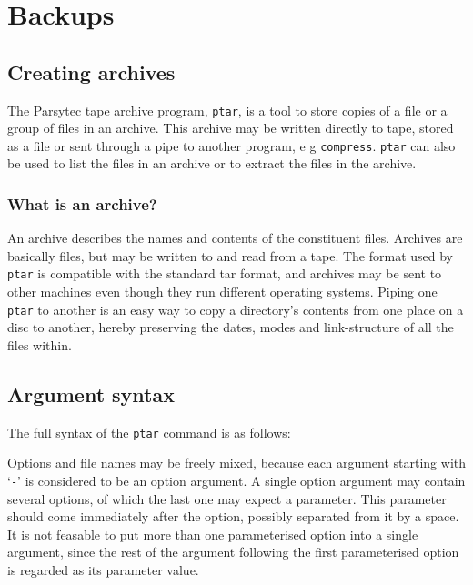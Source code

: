 \chapter{Backups}

\section{Creating archives}

The Parsytec tape archive program, {\tt ptar}, is a tool 
to store copies of a file or a group of files in an archive. This archive may be 
written directly to tape, stored as a file or sent through a pipe to another 
program, e g {\tt compress}. {\tt ptar} can also be used to list the files in an 
archive or to extract the files in the archive.

\subsection{What is an archive?}

An archive describes the names and contents of the constituent files. 
Archives are basically files, but may be written to and read from a tape. The 
format used by {\tt ptar} is compatible with the standard tar format, and 
archives may be sent to other machines even though they run different 
operating systems. Piping one {\tt ptar} to another is an easy way to copy a 
directory's contents from one place on a disc to another, hereby preserving 
the dates, modes and link-structure of all the files within.

\section{Argument syntax}

The full syntax of the {\tt ptar} command is as follows:


Options and file names may be freely mixed, because each argument starting
with `{\tt -}' is considered to be an option argument. A single option
argument may contain several options, of which the last one may expect a 
parameter. This parameter should come immediately after the option, possibly 
separated from it by a space. It is not feasable to put more than one 
parameterised option into a single argument, since the rest of the argument 
following the first parameterised option is regarded as its parameter value.

